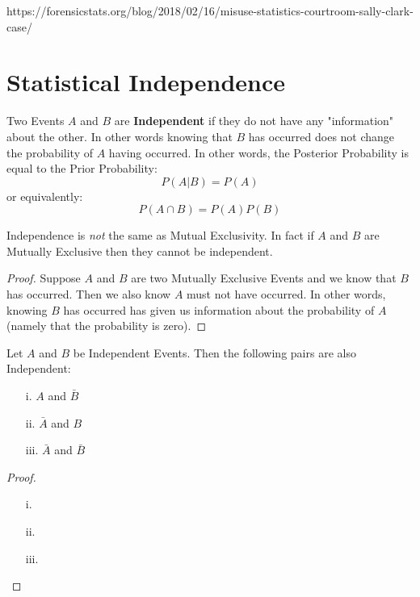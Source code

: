 \documentclass{report}
\begin{document}
\todo https://forensicstats.org/blog/2018/02/16/misuse-statistics-courtroom-sally-clark-case/

\section{Statistical Independence}
Two Events $A$ and $B$ are \textbf{Independent} if they do not have any "information" about the other. In other words knowing that $B$ has occurred does not change the probability of $A$ having occurred. In other words, the Posterior Probability is equal to the Prior Probability:
\[
    P(A|B)=P(A)
\]
or equivalently:
\[
    P(A\cap B)=P(A)P(B)
\]
\begin{notsofast}
    Independence is \emph{not} the same as Mutual Exclusivity. In fact if $A$ and $B$ are Mutually Exclusive then they cannot be independent. 
    \begin{proof}
        Suppose $A$ and $B$ are two Mutually Exclusive Events and we know that $B$ has occurred. Then we also know $A$ must not have occurred. In other words, knowing $B$ has occurred has given us information about the probability of $A$ (namely that the probability is zero). 
    \end{proof}
\end{notsofast}

\begin{lemma}
Let $A$ and $B$ be Independent Events. Then the following pairs are also Independent:
\begin{enumerate}
    \item[i.] $A$ and $\bar B$
    \item[ii.] $\bar A$ and $B$
    \item[iii.] $\bar A$ and $\bar B$
\end{enumerate}
\tcblower
\begin{proof}
    \begin{enumerate}
        \item[]
        \item[i.] 
        \item[ii.] 
        \item[iii.] 
    \end{enumerate}
\end{proof}
\end{lemma}
\end{document}
